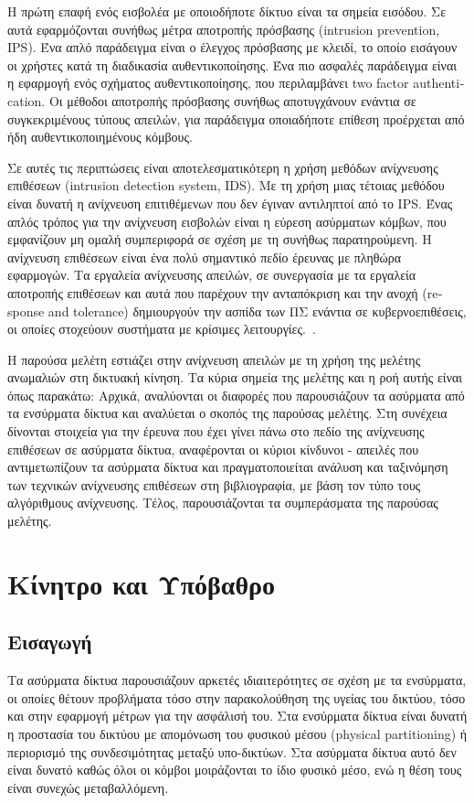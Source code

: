 \documentclass[12pt]{report}
\begin{document}
Η πρώτη επαφή ενός εισβολέα με οποιοδήποτε δίκτυο είναι τα σημεία εισόδου. Σε αυτά εφαρμόζονται συνήθως μέτρα αποτροπής πρόσβασης (\textlatin{intrusion prevention, IPS}). Ένα απλό παράδειγμα είναι ο έλεγχος πρόσβασης με κλειδί, το οποίο εισάγουν οι χρήστες κατά τη διαδικασία αυθεντικοποίησης. Ένα πιο ασφαλές παράδειγμα είναι η εφαρμογή ενός σχήματος αυθεντικοποίησης, που περιλαμβάνει \textlatin{two factor authentication}. Οι μέθοδοι αποτροπής πρόσβασης συνήθως αποτυγχάνουν ενάντια σε συγκεκριμένους τύπους απειλών, για παράδειγμα οποιαδήποτε επίθεση προέρχεται από ήδη αυθεντικοποιημένους κόμβους.

Σε αυτές τις περιπτώσεις είναι αποτελεσματικότερη η χρήση μεθόδων ανίχνευσης επιθέσεων (\textlatin{intrusion detection system, IDS}). Με τη χρήση μιας τέτοιας μεθόδου είναι δυνατή η ανίχνευση επιτιθέμενων που δεν έγιναν αντιληπτοί από το \textlatin{IPS}. Ένας απλός τρόπος για την ανίχνευση εισβολών είναι η εύρεση ασύρματων κόμβων, που εμφανίζουν μη ομαλή συμπεριφορά σε σχέση με τη συνήθως παρατηρούμενη. Η ανίχνευση επιθέσεων είναι ένα πολύ σημαντικό πεδίο έρευνας με πληθώρα εφαρμογών. Τα εργαλεία ανίχνευσης απειλών, σε συνεργασία με τα εργαλεία αποτροπής επιθέσεων και αυτά που παρέχουν την ανταπόκριση και την ανοχή (\textlatin{response and tolerance}) δημιουργούν την ασπίδα των ΠΣ ενάντια σε κυβερνοεπιθέσεις, οι οποίες στοχεύουν συστήματα με κρίσιμες λειτουργίες.~\cite{paper:13}.

Η παρούσα μελέτη εστιάζει στην ανίχνευση απειλών με τη χρήση της μελέτης ανωμαλιών στη δικτυακή κίνηση. Τα κύρια σημεία της μελέτης και η ροή αυτής είναι όπως παρακάτω: Αρχικά, αναλύονται οι διαφορές που παρουσιάζουν τα ασύρματα από τα ενσύρματα δίκτυα και αναλύεται ο σκοπός της παρούσας μελέτης. Στη συνέχεια δίνονται στοιχεία για την έρευνα που έχει γίνει πάνω στο πεδίο της ανίχνευσης επιθέσεων σε ασύρματα δίκτυα, αναφέρονται οι κύριοι κίνδυνοι - απειλές που αντιμετωπίζουν τα ασύρματα δίκτυα και πραγματοποιείται ανάλυση και ταξινόμηση των τεχνικών ανίχνευσης επιθέσεων στη βιβλιογραφία, με βάση τον τύπο τους αλγόριθμους ανίχνευσης. Τέλος, παρουσιάζονται τα συμπεράσματα της παρούσας μελέτης.

\chapter{Κίνητρο και Υπόβαθρο}
\section{Εισαγωγή}
Τα ασύρματα δίκτυα παρουσιάζουν αρκετές ιδιαιτερότητες σε σχέση με τα ενσύρματα, οι οποίες θέτουν προβλήματα τόσο στην παρακολούθηση της υγείας του δικτύου, τόσο και στην εφαρμογή μέτρων για την ασφάλισή του. Στα ενσύρματα δίκτυα είναι δυνατή η προστασία του δικτύου με απομόνωση του φυσικού μέσου (\textlatin{physical partitioning}) ή περιορισμό της συνδεσιμότητας μεταξύ υπο-δικτύων. Στα ασύρματα δίκτυα αυτό δεν είναι δυνατό καθώς όλοι οι κόμβοι μοιράζονται το ίδιο φυσικό μέσο, ενώ η θέση τους είναι συνεχώς μεταβαλλόμενη.
\end{document}
